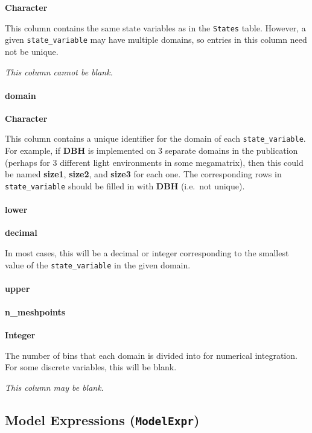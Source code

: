 \documentclass[]{article}
\let\oldparagraph\paragraph
\renewcommand{\paragraph}[1]{\oldparagraph{#1}\mbox{}}
\begin{document}
\textbf{Character}

This column contains the same state variables as in the \texttt{States}
table. However, a given \texttt{state\_variable} may have multiple
domains, so entries in this column need not be unique.

\emph{This column cannot be blank.}

\paragraph{domain}\label{domain}

\textbf{Character}

This column contains a unique identifier for the domain of each
\texttt{state\_variable}. For example, if \textbf{DBH} is implemented on
3 separate domains in the publication (perhaps for 3 different light
environments in some megamatrix), then this could be named
\textbf{size1}, \textbf{size2}, and \textbf{size3} for each one. The
corresponding rows in \texttt{state\_variable} should be filled in with
\textbf{DBH} (i.e.~not unique).

\paragraph{lower}\label{lower}

\textbf{decimal}

In most cases, this will be a decimal or integer corresponding to the
smallest value of the \texttt{state\_variable} in the given domain.

\paragraph{upper}\label{upper}

\paragraph{n\_meshpoints}\label{n_meshpoints}

\textbf{Integer}

The number of bins that each domain is divided into for numerical
integration. For some discrete variables, this will be blank.

\emph{This column may be blank.}

\subsection{\texorpdfstring{Model Expressions
(\texttt{ModelExpr})}{Model Expressions (ModelExpr)}}\label{model-expressions-modelexpr}
\end{document}
